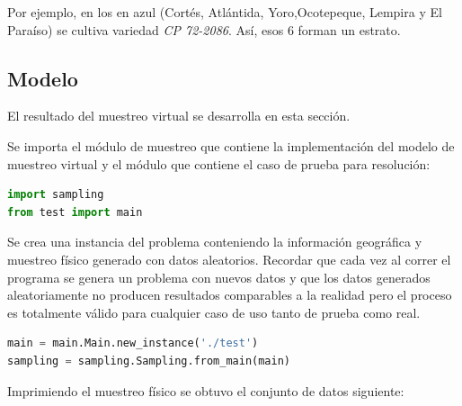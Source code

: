 \documentclass[conference]{IEEEtran}
\begin{document}
\bigbreak

Por ejemplo, en los  en azul (Cortés, Atlántida, Yoro,Ocotepeque, Lempira y El Paraíso) se cultiva variedad \textit{CP 72-2086}. Así, esos $6$  forman un estrato.

\subsection{Modelo}

El resultado del muestreo virtual se desarrolla en esta sección.

\bigbreak

Se importa el módulo de muestreo que contiene la implementación del modelo de muestreo virtual y el módulo que contiene el caso de prueba para resolución:

\bigbreak

\begin{lstlisting}[language=Python, caption=Importar dependencias]
import sampling
from test import main
\end{lstlisting}

\bigbreak

Se crea una instancia del problema conteniendo la información geográfica y muestreo físico generado con datos aleatorios. Recordar que cada vez al correr el programa se genera un problema con nuevos datos y que los datos generados aleatoriamente no producen resultados comparables a la realidad pero el proceso es totalmente válido para cualquier caso de uso tanto de prueba como real.

\bigbreak

\begin{lstlisting}[language=Python, caption=Importar dependencias]
main = main.Main.new_instance('./test')
sampling = sampling.Sampling.from_main(main)
\end{lstlisting}

\bigbreak

Imprimiendo el muestreo físico se obtuvo el conjunto de datos siguiente:
\end{document}
